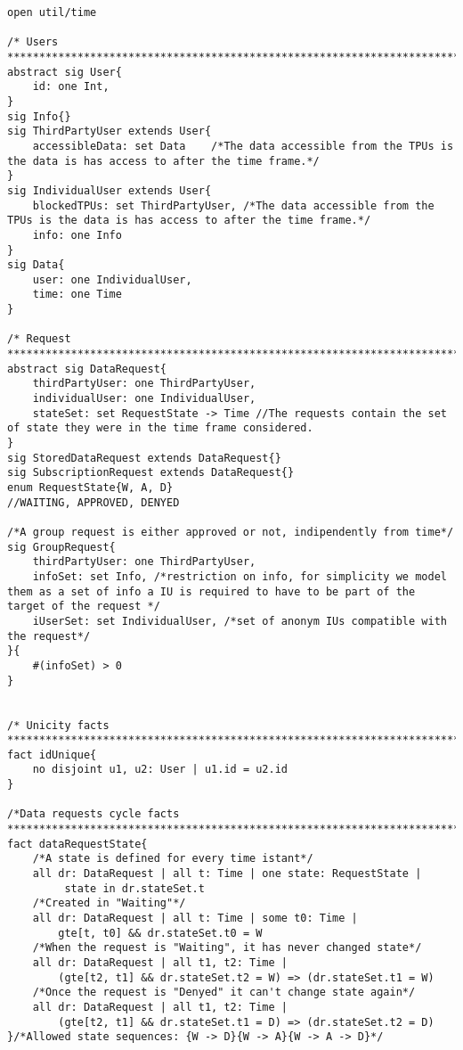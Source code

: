 \begin{lstlisting}
open util/time

/* Users
***************************************************************************************************************************************/
abstract sig User{
	id: one Int,
}
sig Info{}
sig ThirdPartyUser extends User{
	accessibleData: set Data	/*The data accessible from the TPUs is the data is has access to after the time frame.*/
}
sig IndividualUser extends User{
	blockedTPUs: set ThirdPartyUser, /*The data accessible from the TPUs is the data is has access to after the time frame.*/
	info: one Info
}	
sig Data{
	user: one IndividualUser,
	time: one Time
}

/* Request
***************************************************************************************************************************************/
abstract sig DataRequest{
	thirdPartyUser: one ThirdPartyUser,
	individualUser: one IndividualUser,
	stateSet: set RequestState -> Time //The requests contain the set of state they were in the time frame considered.
}
sig StoredDataRequest extends DataRequest{}
sig SubscriptionRequest extends DataRequest{}
enum RequestState{W, A, D}
//WAITING, APPROVED, DENYED

/*A group request is either approved or not, indipendently from time*/
sig GroupRequest{
	thirdPartyUser: one ThirdPartyUser,
	infoSet: set Info, /*restriction on info, for simplicity we model them as a set of info a IU is required to have to be part of the target of the request */
	iUserSet: set IndividualUser, /*set of anonym IUs compatible with the request*/
}{
	#(infoSet) > 0
}


/* Unicity facts
***************************************************************************************************************************************/
fact idUnique{
	no disjoint u1, u2: User | u1.id = u2.id
}

/*Data requests cycle facts
***************************************************************************************************************************************/
fact dataRequestState{
	/*A state is defined for every time istant*/
	all dr: DataRequest | all t: Time | one state: RequestState |
		 state in dr.stateSet.t
	/*Created in "Waiting"*/
	all dr: DataRequest | all t: Time | some t0: Time | 
		gte[t, t0] && dr.stateSet.t0 = W
	/*When the request is "Waiting", it has never changed state*/
	all dr: DataRequest | all t1, t2: Time | 
		(gte[t2, t1] && dr.stateSet.t2 = W) => (dr.stateSet.t1 = W)
	/*Once the request is "Denyed" it can't change state again*/
	all dr: DataRequest | all t1, t2: Time | 
		(gte[t2, t1] && dr.stateSet.t1 = D) => (dr.stateSet.t2 = D)
}/*Allowed state sequences: {W -> D}{W -> A}{W -> A -> D}*/


\end{lstlisting}
